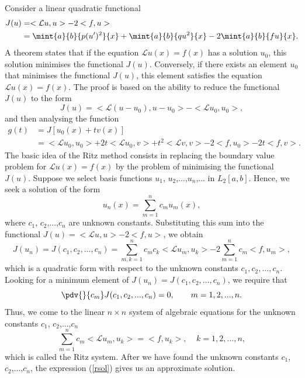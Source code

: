 \noindent Consider a linear quadratic functional
%
\begin{subequations}
  \label{fun}
  \begin{align}
    J(u) & = <\mathcal{L}u,u>-2<f,u> \\
         & = \mint{a}{b}{p(u')^2}{x} + \mint{a}{b}{q u^2}{x} -2 \mint{a}{b}{f
         u}{x}.
  \end{align}
\end{subequations}
%
A theorem states that if the equation $\mathcal{L}u(x)=f(x)$ has a
solution $u_0$, this solution minimises the functional
$J(u)$. Conversely, if there exists an element $u_0$ that minimises
the functional $J(u)$, this element satisfies the equation
$\mathcal{L}u(x)=f(x)$.  The proof is based on the ability to reduce
the functional $J(u)$ to the form
%
\begin{equation*}
  J(u)=<\mathcal{L}(u-u_0),u-u_0>-<\mathcal{L}u_0,u_0>,
\end{equation*}
%
and then analysing the function
%
\begin{align*}
 g(t) & = J[u_0(x)+t v(x)] \\
      & = <\mathcal{L}u_0,u_0> + 2t<\mathcal{L}u_0,v> +
      t^2<\mathcal{L} v,v> - 2<f,u_0> - 2t<f,v>.
\end{align*}
%
The basic idea of the Ritz method consists in replacing the boundary
value problem for $\mathcal{L}u(x)=f(x)$ by the problem of minimising
the functional $J(u)$. Suppose we select basis functions $u_1$,
$u_2$,...,$u_n$,... in $L_2[a,b]$.  Hence, we seek a solution of the
form
%
\begin{equation}
  u_n(x)=\sum_{m=1}^n c_m u_m(x),\label{rsol}
\end{equation}
%
where $c_1$, $c_2$,...,$c_n$ are unknown constants.  Substituting this
sum into the functional $J(u)=<\mathcal{L}u,u>-2<f,u>$, we obtain
%
\begin{equation}
  J(u_n)=J(c_1,c_2,...,c_n)=\sum_{m,k=1}^n c_m c_k<\mathcal{L}u_m,u_k>-
  2\sum_{m=1}^n c_m<f,u_m>,
\end{equation}
%
which is a quadratic form with respect to the unknown constants
$c_1,c_2,...,c_n$.  Looking for a minimum element of
$J(u_n)=J(c_1,c_2,...,c_n)$, we require that
%
\begin{equation}
  \pdv{}{c_m} J(c_1,c_2,...,c_n)=0, \qquad m=1,2,...,n.
\end{equation}
%
Thus, we come to the linear $n\times n$ system of algebraic equations
for the unknown constants $c_1$, $c_2$,...,$c_n$
%
\begin{equation}
  \sum_{m=1}^nc_m<\mathcal{L}u_m,u_k>=<f,u_k>,~~~~~k=1,2,...,n,\label{sys}
\end{equation}
%
which is called the Ritz system.  After we have found the unknown
constants $c_1$, $c_2$,...,$c_n$, the expression (\ref{rsol}) gives us
an approximate solution.

